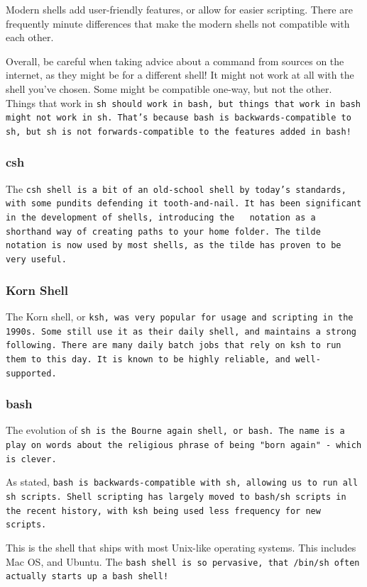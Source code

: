  Modern shells add user-friendly features, or allow for easier scripting. There are frequently
 minute differences that make the modern shells not compatible with each other.

 Overall, be careful when taking advice about a command from sources on the internet,
 as they might be for a different shell! It might not work at all with the shell you've chosen. Some might
 be compatible one-way, but not the other. Things that work in \tt{sh} should work in \tt{bash}, but
 things that work in \tt{bash} might not work in \tt{sh}. That's because \tt{bash} is backwards-compatible
 to \tt{sh}, but \tt{sh} is not forwards-compatible to the features added in \tt{bash}!

 \subsubsection{csh}
 The \tt{csh} shell is a bit of an old-school shell by today's standards, with some
 pundits defending it tooth-and-nail. It has been significant in the development of
 shells, introducing the \tt{~} notation as a shorthand way of creating paths
 to your home folder. The tilde notation is now used by most shells, as the tilde
has proven to be very useful.

\subsubsection{Korn Shell}
The Korn shell, or \tt{ksh}, was very popular for usage and scripting in the 1990s.
Some still use it as their daily shell, and maintains a strong following. There
are many daily batch jobs that rely on \tt{ksh} to run them to this day. It is known
to be highly reliable, and well-supported.

\subsubsection{bash}

The evolution of \tt{sh} is the Bourne again shell, or \tt{bash}. The name
is a play on words about the religious phrase of being "born again" - which
is clever.

As stated, \tt{bash} is backwards-compatible with \tt{sh}, allowing us to run
all \tt{sh} scripts. Shell scripting has largely moved to \tt{bash}/\tt{sh} scripts in the
recent history, with \tt{ksh} being used less frequency for new scripts.

This is the shell that ships with most Unix-like operating systems. This includes Mac OS,
and Ubuntu.
The \tt{bash} shell is so pervasive, that \tt{/bin/sh} often actually
starts up a \tt{bash} shell!




